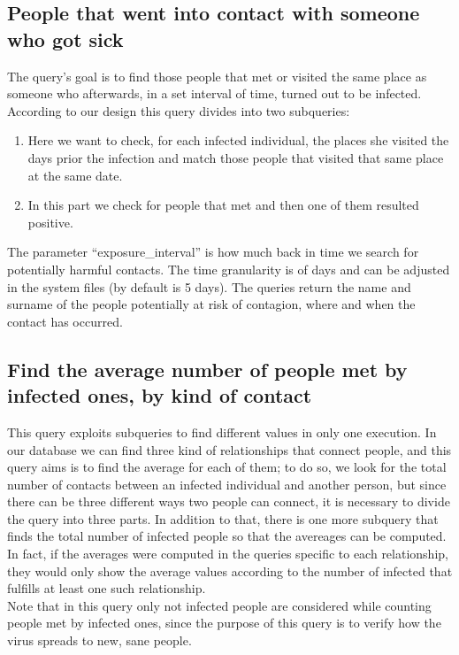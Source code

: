\documentclass{article}
\newenvironment{code}{\captionsetup{type=listing}}{}
\begin{document}
		\subsection{People that went into contact with someone who got sick}
		The query’s goal is to find those people that met or visited the same place as someone who afterwards, in a set interval of time, turned out to be infected. According to our design this query divides into two subqueries:
		\begin{enumerate}
		    \item Here we want to check, for each infected individual, the places she visited the days prior the infection and match those people that visited that same place at the same date.
		    \begin{code}  \end{code}
		    
		   \item In this part we check for people that met and then one of them resulted positive.
		   \begin{code}  \end{code}
		\end{enumerate}
		The parameter “exposure\_interval” is how much back in time we search for potentially harmful contacts. The time granularity is of days and can be adjusted in the system files (by default is 5 days). The queries return the name and surname of the people potentially at risk of contagion, where and when the contact has occurred.
						  
						  
		\subsection{Find the average number of people met by infected ones, by kind of contact}
		\begin{code}
		\end{code}
		This query exploits subqueries to find different values in only one execution. In our database we can find three kind of relationships that connect people, and this query aims is to find the average for each of them; to do so, we look for the total number of contacts between an infected individual and another person, but since there can be three different ways two people can connect, it is necessary to divide the query into three parts. In addition to that, there is one more subquery that finds the total number of infected people so that the avereages can be computed. In fact, if the averages were computed in the queries specific to each relationship, they would only show the average values according to the number of infected that fulfills at least one such relationship.\\
		Note that in this query only not infected people are considered while counting people met by infected ones, since the purpose of this query is to verify how the virus spreads to new, sane people.
				
\end{document}
